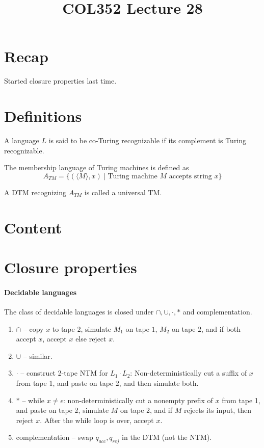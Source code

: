 \documentclass[a4paper]{article}
\title{\textbf{COL352 Lecture 28}}
\date{}
\begin{document}
\maketitle
\tableofcontents

\section{Recap}

Started closure properties last time.

\section{Definitions}

\begin{defn}
    A language $L$ is said to be co-Turing recognizable if its complement is Turing recognizable.
\end{defn}

\begin{defn}
    The membership language of Turing machines is defined as
    \[
        A_{TM} = \{(\langle M \rangle, x) \mid \text{Turing machine } M \text{ accepts string }x\}
    \]
\end{defn}

\begin{defn}
    A DTM recognizing $A_{TM}$ is called a universal TM.
\end{defn}

\section{Content}

\section{Closure properties}
\paragraph{Decidable languages} The class of decidable languages is closed under $\cap, \cup, \cdot, *$ and complementation.
        \begin{enumerate}
            \item $\cap$ -- copy $x$ to tape $2$, simulate $M_1$ on tape $1$, $M_2$ on tape $2$, and if both accept $x$, accept $x$ else reject $x$.
            \item $\cup$ -- similar.
            \item $\cdot$ -- construct 2-tape NTM for $L_1 \cdot L_2$: Non-deterministically cut a suffix of $x$ from tape 1, and paste on tape $2$, and then simulate both.
            \item $*$ -- while $x \ne \epsilon$: non-deterministically cut a nonempty prefix of $x$ from tape 1, and paste on tape 2, simulate $M$ on tape 2, and if $M$ rejects its input, then
                reject $x$. After the while loop is over, accept $x$.
            \item complementation -- swap $q_{acc}, q_{rej}$ in the DTM (not the NTM).
        \end{enumerate}
\end{document}

